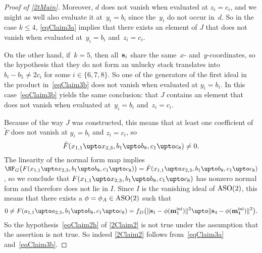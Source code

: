 \documentclass[reqno]{amsart}
\begin{document}
\begin{proof}[Proof of \cref{2tMain}]
  Moreover, $d$ does not vanish when evaluated at $z_i = c_i$, and we
  might as well also evaluate it at~$y_i = b_i$ since the~$y_i$ do not
  occur in~$d$. So in the case $k \le 4$, \eqref{eqClaim3a} implies
  that there exists an element of $J$ that does not vanish when
  evaluated at~$y_i = b_i$ and~$z_i = c_i$.

  On the other hand, if~$k = 5$, then all~$\mathbf{s}_i$ share the
  same~$x$- and~$y$-coordinates, so the hypothesis that they do not form an unlucky stack translates into $b_i - b_5 \ne 2 c_i$ for
  some $i \in \{6,7,8\}$. So one of the generators of the first ideal
  in the product in~\eqref{eqClaim3b} does not vanish when evaluated
  at $y_i = b_i$. In this case~\eqref{eqClaim3b} yields the same
  conclusion: that $J$ contains an element that does not vanish when
  evaluated at~$y_i = b_i$ and~$z_i = c_i$.

  Because of the way $J$ was constructed, this means that at least one
  coefficient of $\tilde{F}$ does not vanish at $y_i = b_i$ and
  $z_i = c_i$, so
  \[
    \tilde{F}(x_{1,1} \upto x_{2,3},b_1 \upto b_8,c_1 \upto c_8) \ne
    0.
  \]
  The linearity of the normal form map implies
  $\NF_G\bigl(F(x_{1,1} \upto x_{2,3},b_1 \upto b_8,c_1 \upto
  c_8)\bigr) = \tilde{F}(x_{1,1} \upto x_{2,3},b_1 \upto b_8,c_1 \upto
  c_8)$, so we conclude that
  $F(x_{1,1} \upto x_{2,3},b_1 \upto b_8,c_1 \upto c_8)$ has nonzero
  normal form and therefore does not lie in $I$. Since $I$ is the
  vanishing ideal of $\operatorname{ASO}(2)$, this means that there exists a
  $\phi = \phi_A \in \operatorname{ASO}(2)$ such that
  \[
    0 \ne F(a_{1,1} \upto a_{2,3},b_1 \upto b_8,c_1 \upto c_8) =
    f_D\bigl(\lVert\ve s_1 - \phi(\ve m_1^\ini)\rVert^2 \upto
    \lVert\ve s_4 - \phi(\ve m_4^\ini)\rVert^2\bigr).
  \]
  So the hypothesis~\eqref{eqClaim2h} of \cref{2Claim2} is not true
  under the assumption that the assertion is not true. So indeed
  \cref{2Claim2} follows from~\eqref{eqClaim3a} and~\eqref{eqClaim3b}.


\end{proof}
\end{document}
